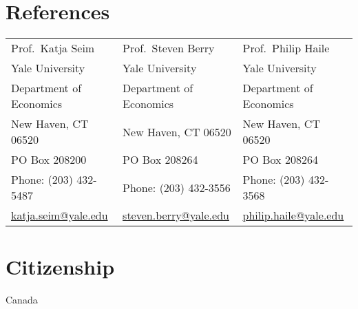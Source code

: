 \documentclass[11pt]{article} %
\begin{document}
\section*{References}

\begin{center}
	\begin{tabular}{l l l}
		Prof.\ Katja Seim &  Prof.\ Steven Berry  & Prof.\ Philip Haile \\
		Yale University & Yale University & Yale University \\
		Department of Economics & Department of Economics & Department of Economics \\
		New Haven, CT 06520  & New Haven, CT 06520  & New Haven, CT 06520  \\
		PO Box 208200 & PO Box 208264 & PO Box 208264 \\
		Phone: (203) 432-5487 & Phone: (203) 432-3556 & Phone: (203) 432-3568      \\
		\href{mailto:katja.seim@yale.edu}{katja.seim@yale.edu}  &  \href{mailto:steven.berry@yale.edu }{steven.berry@yale.edu }  & \href{mailto:philip.haile@yale.edu}{philip.haile@yale.edu}
	\end{tabular}
\end{center}

%
%
%


\section*{Citizenship}

Canada

%
%



\vfill %
\end{document}
